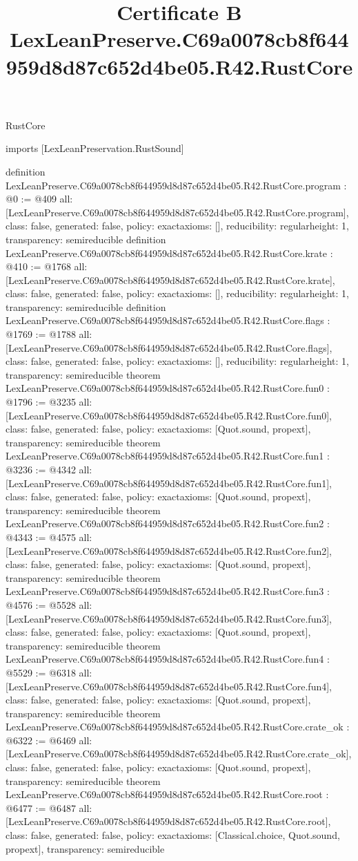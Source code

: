 \begin{lexlean}{RustCore}
\title{Certificate B LexLeanPreserve.C69a0078cb8f644959d8d87c652d4be05.R42.RustCore}
\begin{coremodule}
imports [LexLeanPreservation.RustSound]

definition LexLeanPreserve.C69a0078cb8f644959d8d87c652d4be05.R42.RustCore.program : @0 := @409 {
  all: [LexLeanPreserve.C69a0078cb8f644959d8d87c652d4be05.R42.RustCore.program],
  class: false,
  generated: false,
  policy: exact{axioms: []},
  reducibility: regular{height: 1},
  transparency: semireducible
}
definition LexLeanPreserve.C69a0078cb8f644959d8d87c652d4be05.R42.RustCore.krate : @410 := @1768 {
  all: [LexLeanPreserve.C69a0078cb8f644959d8d87c652d4be05.R42.RustCore.krate],
  class: false,
  generated: false,
  policy: exact{axioms: []},
  reducibility: regular{height: 1},
  transparency: semireducible
}
definition LexLeanPreserve.C69a0078cb8f644959d8d87c652d4be05.R42.RustCore.flags : @1769 := @1788 {
  all: [LexLeanPreserve.C69a0078cb8f644959d8d87c652d4be05.R42.RustCore.flags],
  class: false,
  generated: false,
  policy: exact{axioms: []},
  reducibility: regular{height: 1},
  transparency: semireducible
}
theorem LexLeanPreserve.C69a0078cb8f644959d8d87c652d4be05.R42.RustCore.fun0 : @1796 := @3235 {
  all: [LexLeanPreserve.C69a0078cb8f644959d8d87c652d4be05.R42.RustCore.fun0],
  class: false,
  generated: false,
  policy: exact{axioms: [Quot.sound, propext]},
  transparency: semireducible
}
theorem LexLeanPreserve.C69a0078cb8f644959d8d87c652d4be05.R42.RustCore.fun1 : @3236 := @4342 {
  all: [LexLeanPreserve.C69a0078cb8f644959d8d87c652d4be05.R42.RustCore.fun1],
  class: false,
  generated: false,
  policy: exact{axioms: [Quot.sound, propext]},
  transparency: semireducible
}
theorem LexLeanPreserve.C69a0078cb8f644959d8d87c652d4be05.R42.RustCore.fun2 : @4343 := @4575 {
  all: [LexLeanPreserve.C69a0078cb8f644959d8d87c652d4be05.R42.RustCore.fun2],
  class: false,
  generated: false,
  policy: exact{axioms: [Quot.sound, propext]},
  transparency: semireducible
}
theorem LexLeanPreserve.C69a0078cb8f644959d8d87c652d4be05.R42.RustCore.fun3 : @4576 := @5528 {
  all: [LexLeanPreserve.C69a0078cb8f644959d8d87c652d4be05.R42.RustCore.fun3],
  class: false,
  generated: false,
  policy: exact{axioms: [Quot.sound, propext]},
  transparency: semireducible
}
theorem LexLeanPreserve.C69a0078cb8f644959d8d87c652d4be05.R42.RustCore.fun4 : @5529 := @6318 {
  all: [LexLeanPreserve.C69a0078cb8f644959d8d87c652d4be05.R42.RustCore.fun4],
  class: false,
  generated: false,
  policy: exact{axioms: [Quot.sound, propext]},
  transparency: semireducible
}
theorem LexLeanPreserve.C69a0078cb8f644959d8d87c652d4be05.R42.RustCore.crate_ok : @6322 := @6469 {
  all: [LexLeanPreserve.C69a0078cb8f644959d8d87c652d4be05.R42.RustCore.crate_ok],
  class: false,
  generated: false,
  policy: exact{axioms: [Quot.sound, propext]},
  transparency: semireducible
}
theorem LexLeanPreserve.C69a0078cb8f644959d8d87c652d4be05.R42.RustCore.root : @6477 := @6487 {
  all: [LexLeanPreserve.C69a0078cb8f644959d8d87c652d4be05.R42.RustCore.root],
  class: false,
  generated: false,
  policy: exact{axioms: [Classical.choice, Quot.sound, propext]},
  transparency: semireducible
}


\end{coremodule}
\end{lexlean}
